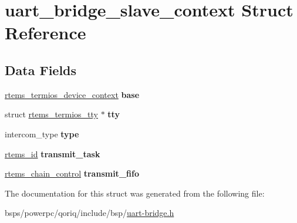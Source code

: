 \hypertarget{structuart__bridge__slave__context}{}\section{uart\+\_\+bridge\+\_\+slave\+\_\+context Struct Reference}
\label{structuart__bridge__slave__context}
\subsection*{Data Fields}
\begin{DoxyCompactItemize}
\item 
\mbox{\label{structuart__bridge__slave__context_adc9e977c489b7953666a1446d25e6f02}} 
\mbox{\hyperlink{structrtems__termios__device__context}{rtems\+\_\+termios\+\_\+device\+\_\+context}} {\bfseries base}
\item 
\mbox{\label{structuart__bridge__slave__context_a0031da9d23089141a0d4968ce0954cd7}} 
struct \mbox{\hyperlink{structrtems__termios__tty}{rtems\+\_\+termios\+\_\+tty}} $\ast$ {\bfseries tty}
\item 
\mbox{\label{structuart__bridge__slave__context_ab35e0bd1a771189468f878bd8e5d6980}} 
intercom\+\_\+type {\bfseries type}
\item 
\mbox{\label{structuart__bridge__slave__context_ad9d556c924f2c788301e7d343d18baf4}} 
\mbox{\hyperlink{group__ClassicTasks_gab20892b814dced7dd4e5b9bf42becd57}{rtems\+\_\+id}} {\bfseries transmit\+\_\+task}
\item 
\mbox{\label{structuart__bridge__slave__context_ad341ab21914b84b7601969ba3c0f4ef8}} 
\mbox{\hyperlink{unionChain__Control}{rtems\+\_\+chain\+\_\+control}} {\bfseries transmit\+\_\+fifo}
\end{DoxyCompactItemize}


The documentation for this struct was generated from the following file\+:\begin{DoxyCompactItemize}
\item 
bsps/powerpc/qoriq/include/bsp/\mbox{\hyperlink{uart-bridge_8h}{uart-\/bridge.\+h}}\end{DoxyCompactItemize}
